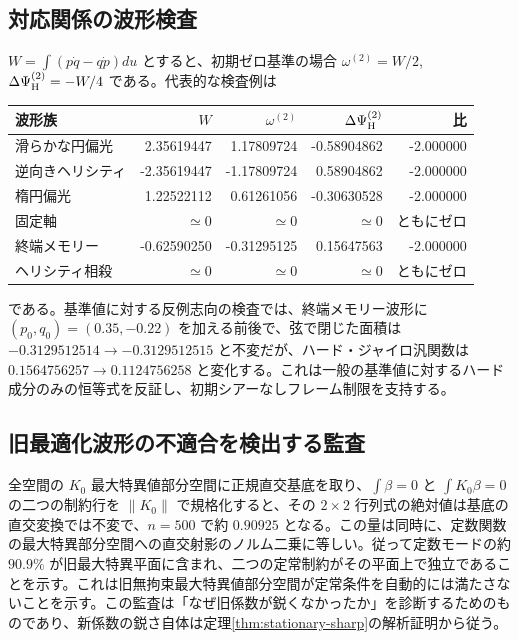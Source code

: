 \subsection{対応関係の波形検査}
$W=\int(p\dot q-q\dot p)du$ とすると、初期ゼロ基準の場合 $\omega^{(2)}=W/2$, $\Delta\Psi_{\rm H}^{(2)}=-W/4$ である。代表的な検査例は
\begin{center}
\begin{tabular}{lrrrr}
\toprule
波形族&$W$&$\omega^{(2)}$&$\Delta\Psi_{\rm H}^{(2)}$&比\\
\midrule
滑らかな円偏光&2.35619447&1.17809724&-0.58904862&-2.000000\\
逆向きヘリシティ&-2.35619447&-1.17809724&0.58904862&-2.000000\\
楕円偏光&1.22522112&0.61261056&-0.30630528&-2.000000\\
固定軸&$\simeq0$&$\simeq0$&$\simeq0$&ともにゼロ\\
終端メモリー&-0.62590250&-0.31295125&0.15647563&-2.000000\\
ヘリシティ相殺&$\simeq0$&$\simeq0$&$\simeq0$&ともにゼロ\\
\bottomrule
\end{tabular}
\end{center}
である。基準値に対する反例志向の検査では、終端メモリー波形に $(p_0,q_0)=(0.35,-0.22)$ を加える前後で、弦で閉じた面積は $-0.3129512514\to-0.3129512515$ と不変だが、ハード・ジャイロ汎関数は $0.1564756257\to0.1124756258$ と変化する。これは一般の基準値に対するハード成分のみの恒等式を反証し、初期シアーなしフレーム制限を支持する。

\subsection{旧最適化波形の不適合を検出する監査}
全空間の $K_0$ 最大特異値部分空間に正規直交基底を取り、$\int\beta=0$ と $\int K_0\beta=0$ の二つの制約行を $\|K_0\|$ で規格化すると、その $2\times2$ 行列式の絶対値は基底の直交変換では不変で、$n=500$ で約 $0.90925$ となる。この量は同時に、定数関数の最大特異部分空間への直交射影のノルム二乗に等しい。従って定数モードの約 $90.9\%$ が旧最大特異平面に含まれ、二つの定常制約がその平面上で独立であることを示す。これは旧無拘束最大特異値部分空間が定常条件を自動的には満たさないことを示す。この監査は「なぜ旧係数が鋭くなかったか」を診断するためのものであり、新係数の鋭さ自体は定理\ref{thm:stationary-sharp}の解析証明から従う。
